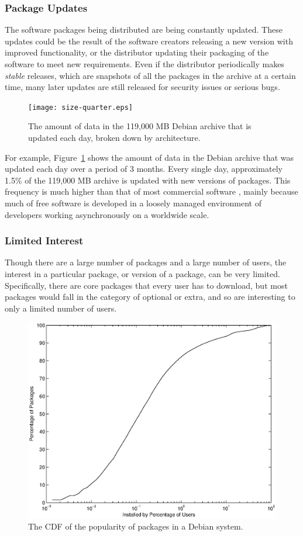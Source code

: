 \documentclass[conference]{IEEEtran}
\begin{document}
\subsubsection{Package Updates}

The software packages being distributed are being constantly
updated. These updates could be the result of the software creators
releasing a new version with improved functionality,
or the distributor updating their packaging of the
software to meet new requirements. Even if the distributor
periodically makes \emph{stable} releases, which are snapshots of
all the packages in the archive at a certain time, many later updates are still
released for security issues or serious bugs.

\begin{figure}
\centering
\texttt{[image: size-quarter.eps]}
\caption{The amount of data in the 119,000 MB Debian archive that is
updated each day, broken down by architecture.}
\label{update_size}
\end{figure}

For example, Figure~\ref{update_size} shows the amount of data in
the Debian archive that was updated each day over a period of 3
months. Every single day, approximately 1.5\% of the 119,000 MB archive is
updated with new versions of packages. This frequency is much higher than
that of most commercial software \cite{microsoft-update}, mainly because much of free software is
developed in a loosely managed environment of developers working
asynchronously on a worldwide scale.

\subsubsection{Limited Interest}

Though there are a large number of packages and a large number of
users, the interest in a particular package, or version of a package, can be very
limited. Specifically, there are core packages that every user has to download, but most
packages would fall in the category of optional or extra, and so are
interesting to only a limited number of users.

\begin{figure}
\centering
\includegraphics[width=0.80\columnwidth]{apt_p2p_popularity-cdf.eps}
\caption{The CDF of the popularity of packages in a Debian system.}
\label{popularity_CDF}
\end{figure}
\end{document}
